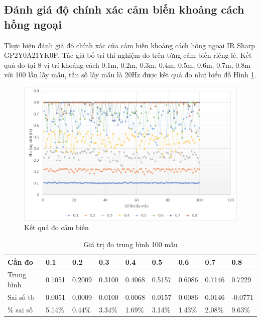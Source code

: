 
\subsection{Đánh giá độ chính xác cảm biến khoảng cách hồng ngoại}
\label{sub:DanhgiaCBIR}

Thực hiện đánh giá độ chính xác của cảm biến khoảng cách hồng ngoại IR Sharp GP2Y0A21YK0F. Tác giả bố trí thí nghiệm đo trên từng cảm biến riêng lẻ. Kết quả đo tại 8 vị trí khoảng cách 0.1m, 0.2m, 0.3m, 0.4m, 0.5m, 0.6m, 0.7m, 0.8m với 100 lần lấy mẫu, tần số lấy mẫu là 20Hz được kết quả đo như biểu đồ Hình \ref{fig:Ir-eval-100}.

\begin{figure}[htbp]
    \centering
    \includegraphics[width=\linewidth]{figures/IR-eval-chart.png}
    \caption{Kết quả đo cảm biến}
    \label{fig:Ir-eval-100}
\end{figure}

\begin{table}[htbp]
    \begin{tabular}{|m{1.5cm}|m{1.2cm}|m{1.2cm}|m{1.2cm}|m{1.2cm}|m{1.2cm}|m{1.2cm}|m{1.2cm}|m{1.4cm}|}
        \hline
        Cần đo     & 0.1      & 0.2      & 0.3      & 0.4      & 0.5      & 0.6      & 0.7      & 0.8      \\ \hline
        Trung bình & 0.1051   & 0.2009   & 0.3100   & 0.4068   & 0.5157   & 0.6086   & 0.7146       & 0.7229 \\ \hline
        Sai số tb & 0.0051 & 0.0009 &   0.0100 & 0.0068 &   0.0157 & 0.0086 &   0.0146 & -0.0771 \\ \hline
        \% sai số  & 5.14\% & 	0.44\% &	3.34\% &	1.69\% &	3.14\% &	1.43\% &	2.08\% &	9.63\% \\
        \hline
    \end{tabular}
    \caption{Giá trị đo trung bình 100 mẫu}
    \label{table:ir-evarage}
\end{table}


